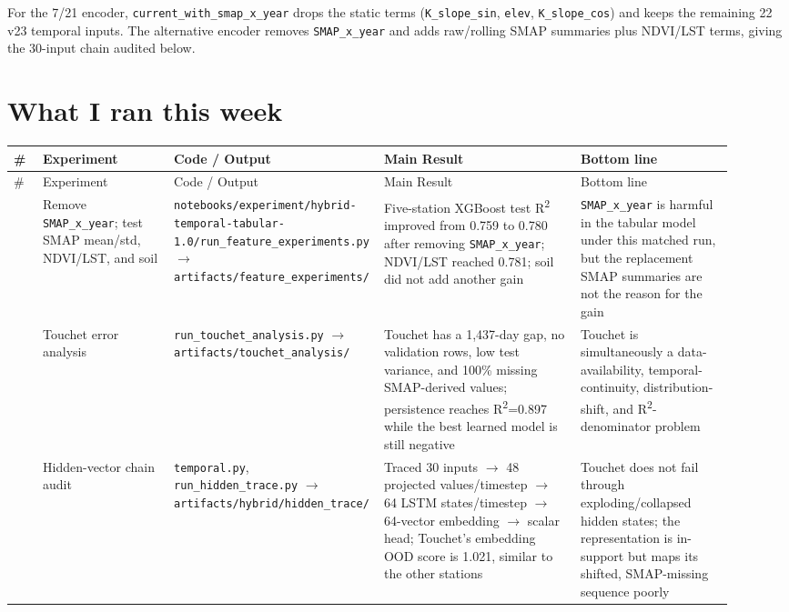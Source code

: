 \documentclass[11pt]{article}
\newcommand{\code}[1]{\begingroup\footnotesize\nolinkurl{#1}\endgroup}
\begin{document}
For the 7/21 encoder, \code{current_with_smap_x_year} drops the static terms (\code{K_slope_sin}, \code{elev}, \code{K_slope_cos}) and keeps the remaining 22 v23 temporal inputs. The alternative encoder removes \code{SMAP_x_year} and adds raw/rolling SMAP summaries plus NDVI/LST terms, giving the 30-input chain audited below.

\section{What I ran this week}

\begin{center}
\scriptsize
\setlength{\tabcolsep}{2pt}
\renewcommand{\arraystretch}{1.16}
\begin{longtable}{>{\RaggedRight\arraybackslash}p{0.045\linewidth}>{\RaggedRight\arraybackslash}p{0.180\linewidth}>{\RaggedRight\arraybackslash}p{0.220\linewidth}>{\RaggedRight\arraybackslash}p{0.270\linewidth}>{\RaggedRight\arraybackslash}p{0.210\linewidth}}
\toprule
\# & Experiment & Code / Output & Main Result & Bottom line \\
\midrule
\endfirsthead
\toprule
\# & Experiment & Code / Output & Main Result & Bottom line \\
\midrule
\endhead
1 & Remove \code{SMAP_x_year}; test SMAP mean/std, NDVI/LST, and soil & \code{notebooks/experiment/hybrid-temporal-tabular-1.0/run_feature_experiments.py} $\rightarrow$ \code{artifacts/feature_experiments/} & Five-station XGBoost test R\textsuperscript{2} improved from 0.759 to 0.780 after removing \code{SMAP_x_year}; NDVI/LST reached 0.781; soil did not add another gain & \code{SMAP_x_year} is harmful in the tabular model under this matched run, but the replacement SMAP summaries are not the reason for the gain \\
2 & Touchet error analysis & \code{run_touchet_analysis.py} $\rightarrow$ \code{artifacts/touchet_analysis/} & Touchet has a 1,437-day gap, no validation rows, low test variance, and 100\% missing SMAP-derived values; persistence reaches R\textsuperscript{2}=0.897 while the best learned model is still negative & Touchet is simultaneously a data-availability, temporal-continuity, distribution-shift, and R\textsuperscript{2}-denominator problem \\
3 & Hidden-vector chain audit & \code{temporal.py}, \code{run_hidden_trace.py} $\rightarrow$ \code{artifacts/hybrid/hidden_trace/} & Traced 30 inputs $\rightarrow$ 48 projected values/timestep $\rightarrow$ 64 LSTM states/timestep $\rightarrow$ 64-vector embedding $\rightarrow$ scalar head; Touchet's embedding OOD score is 1.021, similar to the other stations & Touchet does not fail through exploding/collapsed hidden states; the representation is in-support but maps its shifted, SMAP-missing sequence poorly \\

\end{longtable}
\end{center}
\end{document}
